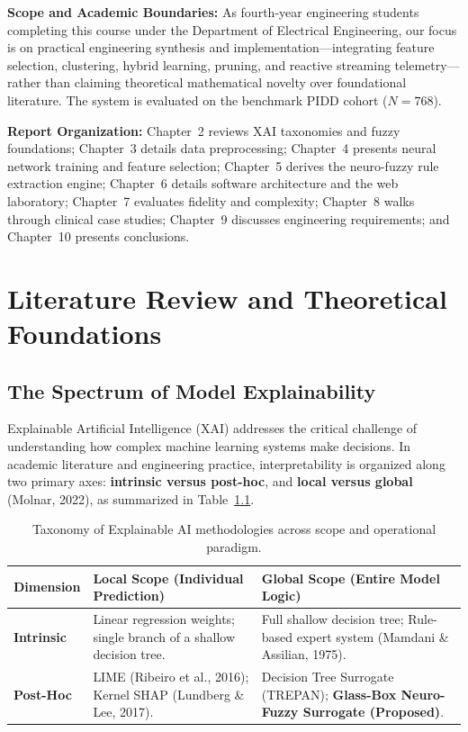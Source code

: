 \documentclass{report}
\begin{document}
\textbf{Scope and Academic Boundaries:} As fourth-year engineering students completing this course under the Department of Electrical Engineering, our focus is on practical engineering synthesis and implementation—integrating feature selection, clustering, hybrid learning, pruning, and reactive streaming telemetry—rather than claiming theoretical mathematical novelty over foundational literature. The system is evaluated on the benchmark PIDD cohort ($N=768$).

\textbf{Report Organization:} Chapter~2 reviews XAI taxonomies and fuzzy foundations; Chapter~3 details data preprocessing; Chapter~4 presents neural network training and feature selection; Chapter~5 derives the neuro-fuzzy rule extraction engine; Chapter~6 details software architecture and the web laboratory; Chapter~7 evaluates fidelity and complexity; Chapter~8 walks through clinical case studies; Chapter~9 discusses engineering requirements; and Chapter~10 presents conclusions.


\chapter{Literature Review and Theoretical Foundations}

\section{The Spectrum of Model Explainability}

Explainable Artificial Intelligence (XAI) addresses the critical challenge of understanding how complex machine learning systems make decisions. In academic literature and engineering practice, interpretability is organized along two primary axes: \textbf{intrinsic versus post-hoc}, and \textbf{local versus global} (Molnar, 2022), as summarized in Table~\ref{tab:xai_taxonomy}.

\begin{table}[htbp]
    \centering
    \footnotesize
    \renewcommand{\arraystretch}{0.85}
    \begin{tabularx}{\textwidth}{l X X}
    \toprule
    \textbf{Dimension} & \textbf{Local Scope (Individual Prediction)} & \textbf{Global Scope (Entire Model Logic)} \\
    \midrule
    \textbf{Intrinsic} & Linear regression weights; single branch of a shallow decision tree. & Full shallow decision tree; Rule-based expert system (Mamdani \& Assilian, 1975). \\
    \midrule
    \textbf{Post-Hoc} & LIME (Ribeiro et al., 2016); Kernel SHAP (Lundberg \& Lee, 2017). & Decision Tree Surrogate (TREPAN); \textbf{Glass-Box Neuro-Fuzzy Surrogate (Proposed)}. \\
    \bottomrule
    \end{tabularx}
    \caption[Taxonomy of Explainable AI Methodologies]{Taxonomy of Explainable AI methodologies across scope and operational paradigm.}
    \label{tab:xai_taxonomy}
\end{table}
\end{document}
